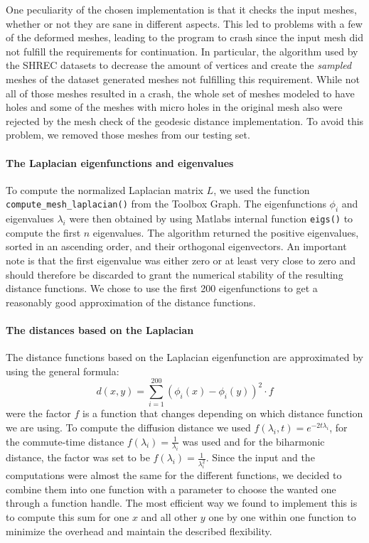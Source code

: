 One peculiarity of the chosen implementation is that it checks the input meshes, whether or not they are sane in different aspects.
This led to problems with a few of the deformed meshes, leading to the program to crash since the input mesh did not fulfill the requirements for continuation.
In particular, the algorithm used by the SHREC datasets to decrease the amount of vertices and create the \textit{sampled} meshes of the dataset generated meshes not fulfilling this requirement.
While not all of those meshes resulted in a crash, the whole set of meshes modeled to have holes and some of the meshes with micro holes in the original mesh also were rejected by the mesh check of the geodesic distance implementation.
To avoid this problem, we removed those meshes from our testing set.

\paragraph{The Laplacian eigenfunctions and eigenvalues}
To compute the normalized Laplacian matrix $L$, we used the function \texttt{compute\_mesh\_laplacian()} from the Toolbox Graph.
The eigenfunctions $\phi_i$ and eigenvalues $\lambda_i$ were then obtained by using Matlabs internal function \texttt{eigs()} to compute the first $n$ eigenvalues.
The algorithm returned the positive eigenvalues, sorted in an ascending order, and their orthogonal eigenvectors.
An important note is that the first eigenvalue was either zero or at least very close to zero and should therefore be discarded to grant the numerical stability of the resulting distance functions.
We chose to use the first 200 eigenfunctions to get a reasonably good approximation of the distance functions.

\paragraph{The distances based on the Laplacian}
The distance functions based on the Laplacian eigenfunction are approximated by using the general formula:
\begin{equation}
	d(x,y) = \sum_{i=1}^{200} (\phi_i(x) - \phi_i(y))^2 \cdot f
\end{equation}
were the factor $f$ is a function that changes depending on which distance function we are using.
To compute the diffusion distance we used $f(\lambda_i,t) = e^{-2t\lambda_i}$, for the commute-time distance $f(\lambda_i) = \frac{1}{\lambda_i}$ was used and for the biharmonic distance, the factor was set to be $f(\lambda_i) = \frac{1}{\lambda_i^2}$.
Since the input and the computations were almost the same for the different functions, we decided to combine them into one function with a parameter to choose the wanted one through a function handle.
The most efficient way we found to implement this is to compute this sum for one $x$ and all other $y$ one by one within one function to minimize the overhead and maintain the described flexibility.


